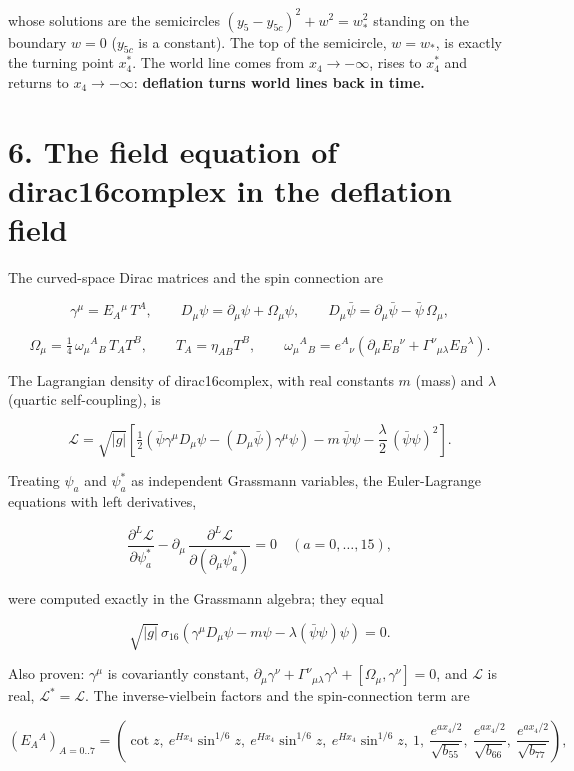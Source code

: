 \documentclass[10pt]{article}
\makeatletter
\newcommand\keepnext{\par\nopagebreak\@nobreaktrue\everypar{\@nobreakfalse\everypar{}}}
\makeatother
\begin{document}
whose solutions are the semicircles $(y_5 - y_{5c})^2 + w^2 = w_*^2$ standing on the boundary $w = 0$ ($y_{5c}$ is a constant). The top of the semicircle, $w = w_*$, is exactly the turning point $x_4^*$. The world line comes from $x_4 \to -\infty$, rises to $x_4^*$ and returns to $x_4 \to -\infty$: \textbf{deflation turns world lines back in time.}


\section*{6. The field equation of dirac16complex in the deflation field}

The curved-space Dirac matrices and the spin connection are\keepnext


\[
\gamma^\mu = E_A{}^\mu\,T^A, \qquad D_\mu\psi = \partial_\mu\psi + \Omega_\mu\psi, \qquad D_\mu\bar\psi = \partial_\mu\bar\psi - \bar\psi\,\Omega_\mu ,
\]

\[
\Omega_\mu = \tfrac14\,\omega_\mu{}^A{}_B\,T_AT^B, \qquad T_A = \eta_{AB}T^B, \qquad \omega_\mu{}^A{}_B = e^A{}_\nu\left(\partial_\mu E_B{}^\nu + \Gamma^\nu{}_{\mu\lambda}E_B{}^\lambda\right).
\]

The Lagrangian density of dirac16complex, with real constants $m$ (mass) and $\lambda$ (quartic self-coupling), is\keepnext


\[
\mathcal L = \sqrt{\lvert g\rvert}\left[\tfrac12\left(\bar\psi\gamma^\mu D_\mu\psi - (D_\mu\bar\psi)\gamma^\mu\psi\right) - m\,\bar\psi\psi - \frac\lambda2\,(\bar\psi\psi)^2\right].
\]

Treating $\psi_a$ and $\psi_a^*$ as independent Grassmann variables, the Euler-Lagrange equations with left derivatives,\keepnext


\[
\frac{\partial^L\mathcal L}{\partial\psi_a^*} - \partial_\mu\,\frac{\partial^L\mathcal L}{\partial(\partial_\mu\psi_a^*)} = 0 \quad (a = 0, \dots, 15),
\]

were computed exactly in the Grassmann algebra; they equal\keepnext


\[
\sqrt{\lvert g\rvert}\,\sigma_{16}\left(\gamma^\mu D_\mu\psi - m\psi - \lambda(\bar\psi\psi)\psi\right) = 0 .
\]

Also proven: $\gamma^\mu$ is covariantly constant, $\partial_\mu\gamma^\nu + \Gamma^\nu{}_{\mu\lambda}\gamma^\lambda + [\Omega_\mu, \gamma^\nu] = 0$, and $\mathcal L$ is real, $\mathcal L^* = \mathcal L$. The inverse-vielbein factors and the spin-connection term are\keepnext


\[
\left(E_A{}^A\right)_{A=0..7} = \left(\cot z,\ e^{Hx_4}\sin^{1/6}z,\ e^{Hx_4}\sin^{1/6}z,\ e^{Hx_4}\sin^{1/6}z,\ 1,\ \frac{e^{ax_4/2}}{\sqrt{b_{55}}},\ \frac{e^{ax_4/2}}{\sqrt{b_{66}}},\ \frac{e^{ax_4/2}}{\sqrt{b_{77}}}\right),
\]
\end{document}

